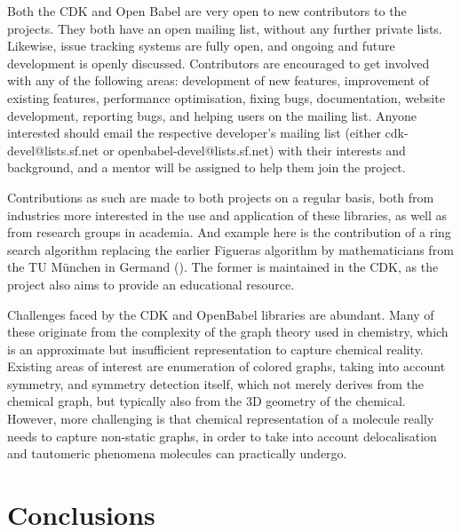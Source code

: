 \documentclass{sig-alternate}
\begin{document}
Both the CDK and Open Babel are very open to new contributors to the projects.
They both have an open mailing list, without any further private lists.
Likewise, issue tracking systems are fully open, and ongoing and future
development is openly discussed. Contributors are encouraged to get involved
with any of the following areas: development of new features, improvement of
existing features, performance optimisation, fixing bugs, documentation, website
development, reporting bugs, and helping users on the mailing list. Anyone
interested should email the respective developer’s mailing list (either
cdk-devel@lists.sf.net or openbabel-devel@lists.sf.net) with their interests and
background, and a mentor will be assigned to help them join the project.

Contributions as such are made to both projects on a regular basis, both from
industries more interested in the use and application of these libraries, as
well as from research groups in academia. And example here is the contribution
of a ring search algorithm replacing the earlier Figueras algorithm by
mathematicians from the TU M\"{u}nchen in Germand (\cite{Berger2004}). The former is
maintained in the CDK, as the project also aims to provide an educational
resource.  

Challenges faced by the CDK and OpenBabel libraries are abundant. Many of these
originate from the complexity of the graph theory used in chemistry, which is an
approximate but insufficient representation to capture chemical reality.
Existing areas of interest are enumeration of colored graphs, taking into
account symmetry, and symmetry detection itself, which not merely derives from
the chemical graph, but typically also from the 3D geometry of the chemical.
However, more challenging is that chemical representation of a molecule really
needs to capture non-static graphs, in order to take into account delocalisation
and tautomeric phenomena molecules can practically undergo.

\section{Conclusions}
\label{sec:conclusions}



  
  
\end{document}
